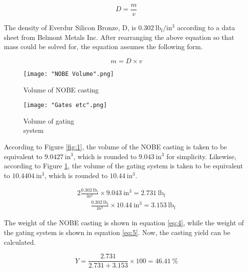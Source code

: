 \documentclass{article}
\begin{document}
\begin{equation}
D = \frac{m}{v}
\end{equation}

The density of Everdur Silicon Bronze, D, is $0.302\ \mathrm{{ lb_f }/{ in^3}}$ according to a data sheet from Belmont Metals Inc.\cite{BelMet} After rearranging the above equation so that mass could be solved for, the equation assumes the following form.

\begin{equation}
m = D \times v
\end{equation}



\begin{figure}[H]
\captionsetup{format =hang}
  \begin{minipage}[b]{0.4\textwidth}
    \texttt{[image: "NOBE Volume".png]}
    \caption{Volume of NOBE casting}
    \label{fig:1}
  \end{minipage}
  \hfill
  \begin{minipage}[b]{0.4\textwidth}
    \texttt{[image: "Gates etc".png]}
    \caption{Volume of gating\\ system}
    \label{fig:2}
  \end{minipage}
\end{figure}



\newpage


According to Figure \ref{fig:1}, the volume of the NOBE casting is taken to be equivalent to $9.0427\ \mathrm{in^3}$, which is rounded to $9.043\ \mathrm{in^3}$ for simplicity. Likewise, according to Figure \ref{fig:2}, the volume of the gating system is taken to be equivalent to $10.4404\ \mathrm{in^3}$, which is rounded to $10.44\ \mathrm{in^3}$. 

\begin{alignat}{2}
\frac{0.302\ \mathrm{lb_f}}{\mathrm{in^3}} \times 9.043\ \mathrm{in^3} = 2.731\ \mathrm{lb_f} \label{eq:4} \\[0.5cm] 
\qquad\frac{0.302\ \mathrm{lb_f}}{\mathrm{in^3}} \times 10.44\ \mathrm{in^3} = 3.153\ \mathrm{lb_f} \label{eq:5}
\end{alignat} 

The weight of the NOBE casting is shown in equation \eqref{eq:4}, while the weight of the gating system is shown in equation \eqref{eq:5}. Now, the casting yield can be calculated.

\begin{equation}
Y = \frac{2.731}{2.731 + 3.153} \times 100 = 46.41\ \%
\end{equation}
 
\end{document}
